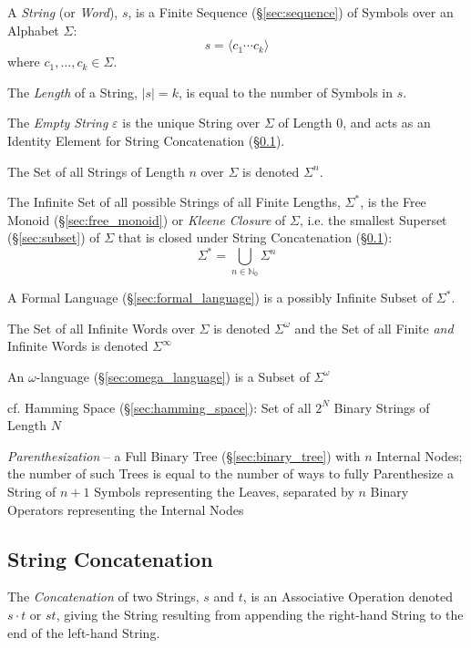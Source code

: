 A \emph{String} (or \emph{Word}), $s$, is a Finite Sequence
(\S\ref{sec:sequence}) of Symbols over an Alphabet $\Sigma$:
\[
  s = \langle c_1 \cdots c_k \rangle
\]
where $c_1, \ldots, c_k \in \Sigma$.

The \emph{Length} of a String, $|s| = k$, is equal to the number of Symbols in
$s$.

The \emph{Empty String} $\varepsilon$ is the unique String over $\Sigma$ of
Length 0, and acts as an Identity Element for String Concatenation
(\S\ref{sec:string_concatenation}).

The Set of all Strings of Length $n$ over $\Sigma$ is denoted $\Sigma^n$.

The Infinite Set of all possible Strings of all Finite Lengths, $\Sigma^*$, is
the Free Monoid (\S\ref{sec:free_monoid}) or \emph{Kleene Closure} of $\Sigma$,
i.e. the smallest Superset (\S\ref{sec:subset}) of $\Sigma$ that is closed under
String Concatenation (\S\ref{sec:string_concatenation}):
\[
  \Sigma^* = \bigcup_{n\in\mathbb{N}_0} \Sigma^n
\]

A Formal Language (\S\ref{sec:formal_language}) is a possibly Infinite Subset of
$\Sigma^*$.

The Set of all Infinite Words over $\Sigma$ is denoted $\Sigma^\omega$ and the
Set of all Finite \emph{and} Infinite Words is denoted $\Sigma^\infty$

An $\omega$-language (\S\ref{sec:omega_language}) is a Subset of $\Sigma^\omega$

\fist cf. Hamming Space (\S\ref{sec:hamming_space}): Set of all $2^N$ Binary
Strings of Length $N$

\emph{Parenthesization} -- a Full Binary Tree (\S\ref{sec:binary_tree}) with $n$
Internal Nodes; the number of such Trees is equal to the number of ways to fully
Parenthesize a String of $n+1$ Symbols representing the Leaves, separated by $n$
Binary Operators representing the Internal Nodes



\subsection{String Concatenation}\label{sec:string_concatenation}

The \emph{Concatenation} of two Strings, $s$ and $t$, is an Associative
Operation denoted $s \cdot t$ or $st$, giving the String resulting from
appending the right-hand String to the end of the left-hand String.

